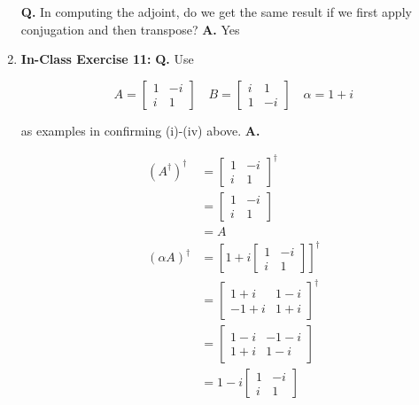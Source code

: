 \documentclass[main.tex]{subfiles}
\begin{document}
\begin{enumerate}
    \textbf{Q.} In computing the adjoint, do we get the same result if we first apply conjugation and then transpose? \textbf{A.} Yes
    
\item[] \textbf{In-Class Exercise 11:} \textbf{Q.} Use

    $$A=\left[\begin{array}{cc}1 & -i \\ i & 1\end{array}\right] \quad B=\left[\begin{array}{cc}i & 1 \\ 1 & -i\end{array}\right] \quad \alpha=1+i$$
    
    as examples in confirming (i)-(iv) above. \textbf{A.}
    
    \begin{align*}
        (A^{\dagger})^{\dagger}             & = \left[\begin{array}{cc}1 & -i \\ i & 1\end{array}\right]^{\dagger}\\
                                            & = \left[\begin{array}{cc}1 & -i \\ i & 1\end{array}\right]\\
                                            & = A\\
        (\alpha A)^{\dagger}                & = \left[1+i \left[\begin{array}{cc}1 & -i \\ i & 1\end{array}\right] \right]^{\dagger}\\
                                            & = \left[\begin{array}{cc} 1+i & 1-i \\ -1+i & 1+i \end{array}\right]^{\dagger}\\
                                            & = \left[\begin{array}{cc} 1-i & -1-i \\ 1+i & 1-i \end{array}\right]\\
                                            & = 1-i \left[\begin{array}{cc}1 & -i \\ i & 1\end{array}\right]\\

\end{align*}
\end{enumerate}
\end{document}
